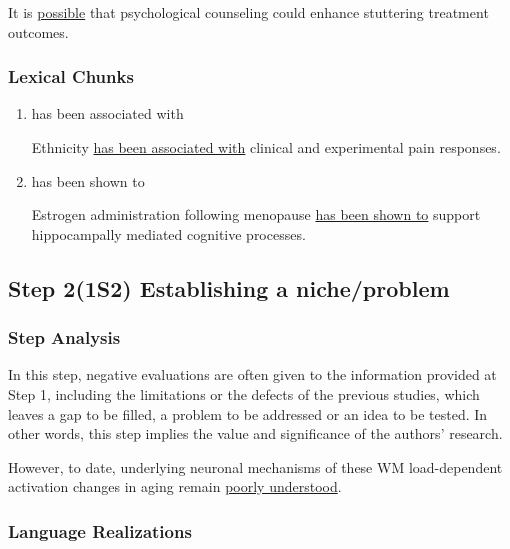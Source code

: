 \documentclass{ctexbook}
\begin{document}
    \begin{eg}[label={myautocounter}]{}
      It is \uline{possible} that psychological counseling could enhance stuttering treatment outcomes.
    \end{eg}

    \subsubsection{Lexical Chunks}

    \begin{enumerate}
      \item has been associated with
      \begin{eg}[label={myautocounter}]{}
        Ethnicity \uline{has been associated with} clinical and experimental pain responses.
      \end{eg}

      \item has been shown to
      \begin{eg}[label={myautocounter}]{}
        Estrogen administration following menopause \uline{has been shown to} support hippocampally mediated cognitive processes.
      \end{eg}
    \end{enumerate}
  
  \subsection{Step 2(1S2) Establishing a niche/problem}

    \subsubsection{Step Analysis}

    In this step, negative evaluations are often given to the information provided at Step 1, including the limitations or the defects of the previous studies, which leaves a gap to be filled, a problem to be addressed or an idea to be tested. In other words, this step implies the value and significance of the authors' research.

    \begin{eg}{}
      However, to date, underlying neuronal mechanisms of these WM load-dependent activation changes in aging remain \uline{poorly understood}.
    \end{eg}

    \subsubsection{Language Realizations}
\end{document}
